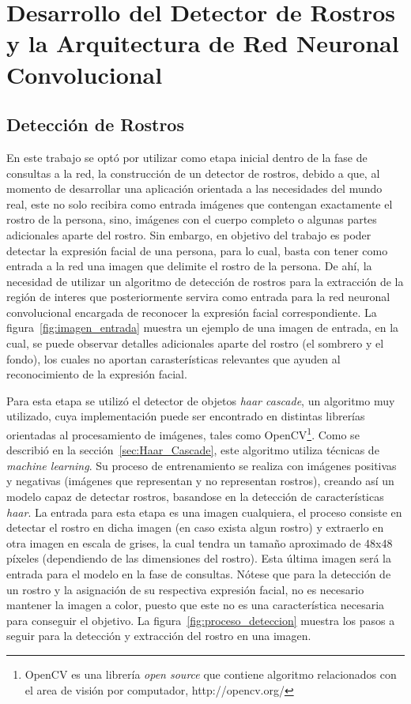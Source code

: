 \chapter{Desarrollo del Detector de Rostros y la Arquitectura de Red Neuronal Convolucional}

\section{Detección de Rostros}
En este trabajo se optó por utilizar como etapa inicial dentro de la fase de consultas a la red, la construcción de un detector de rostros, debido a que, al momento de desarrollar una aplicación orientada a las necesidades del mundo real, este no solo recibira como entrada imágenes que contengan exactamente el rostro de la persona, sino, imágenes con el cuerpo completo o algunas partes adicionales aparte del rostro. Sin embargo, en objetivo del trabajo es poder detectar la expresión facial de una persona, para lo cual, basta con tener como entrada a la red una imagen que delimite el rostro de la persona. De ahí, la necesidad de utilizar un algoritmo de detección de rostros para la extracción de la región de interes que posteriormente servira como entrada para la red neuronal convolucional encargada de reconocer la expresión facial correspondiente. La figura~\ref{fig:imagen_entrada} muestra un ejemplo de una imagen de entrada, en la cual, se puede observar detalles adicionales aparte del rostro (el sombrero y el fondo), los cuales no aportan carasterísticas relevantes que ayuden al reconocimiento de la expresión facial.

Para esta etapa se utilizó el detector de objetos \textit{haar cascade}, un algoritmo muy utilizado, cuya implementación puede ser encontrado en distintas librerías orientadas al procesamiento de imágenes, tales como OpenCV\footnote[5]{OpenCV es una librería \textit{open source} que contiene algoritmo relacionados con el area de visión por computador, http://opencv.org/}. Como se describió en la sección~\ref{sec:Haar_Cascade}, este algoritmo utiliza técnicas de \textit{machine learning}. Su proceso de entrenamiento se realiza con imágenes positivas y negativas (imágenes que representan y no representan rostros), creando así un modelo capaz de detectar rostros, basandose en la detección de características \textit{haar}. La entrada para esta etapa es una imagen cualquiera, el proceso consiste en detectar el rostro en dicha imagen (en caso exista algun rostro) y extraerlo en otra imagen en escala de grises, la cual tendra un tamaño aproximado de 48x48 píxeles (dependiendo de las dimensiones del rostro). Esta última imagen será la entrada para el modelo en la fase de consultas. Nótese que para la detección de un rostro y la asignación de su respectiva expresión facial, no es necesario mantener la imagen a color, puesto que este no es una característica necesaria para conseguir el objetivo. La figura~\ref{fig:proceso_deteccion} muestra los pasos a seguir para la detección y extracción del rostro en una imagen.

